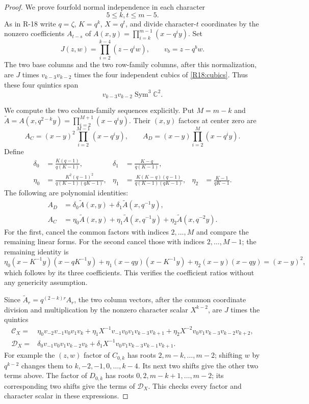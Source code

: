 \begin{proof}
We prove fourfold normal independence in each character
\begin{equation}\label{R19:interior}
 5\leq k,t\leq m-5.
\end{equation}
As in R-18 write $q=\zeta$, $K=q^k$, $X=q^t$, and
divide character-$t$ coordinates by the nonzero
coefficients $A_{t-s}$ of
$A(x,y)=\prod_{i=k}^{m-1}(x-q^iy)$.
Set
\[
 J(z,w)=\prod_{i=2}^{k-4}(z-q^iw),\qquad
 v_b=z-q^bw.
\]
The two base columns and the two row-family columns,
after this normalization, are $J$ times
$v_{k-3}v_{k-2}$ times the four independent cubics
of \eqref{R18:cubics}. Thus these four quintics span
\begin{equation}\label{R19:rowquintics}
 v_{k-3}v_{k-2}\operatorname{Sym}^3\mathbb C^2.
\end{equation}

We compute the two column-family sequences explicitly.
Put $M=m-k$ and
$\widetilde A=A(x,q^{2-k}y)=\prod_{i=2}^{M+1}(x-q^iy)$.
Their $(x,y)$ factors at center zero are
\[
 A_C=(x-y)^2\prod_{i=2}^{M-1}(x-q^iy),\qquad
 A_D=(x-y)\prod_{i=2}^{M}(x-q^iy).
\]
Define
\[
 \begin{aligned}
 \delta_0&=\frac{K(q-1)}{q(K-1)},&
 \delta_1&=\frac{K-q}{q(K-1)},\\
 \eta_0&=\frac{K^2(q-1)^2}{q(K-1)(qK-1)},&
 \eta_1&=\frac{K(K-q)(q-1)}{q(K-1)(qK-1)},&
 \eta_2&=\frac{K-1}{qK-1}.
 \end{aligned}
\]
The following are polynomial identities:
\[
 \begin{aligned}
 A_D&=\delta_0\widetilde A(x,y)
           +\delta_1\widetilde A(x,q^{-1}y),\\
 A_C&=\eta_0\widetilde A(x,y)
           +\eta_1\widetilde A(x,q^{-1}y)
           +\eta_2\widetilde A(x,q^{-2}y).
 \end{aligned}
\]
For the first, cancel the common factors with indices
$2,\ldots,M$ and compare the remaining linear forms.
For the second cancel those with indices $2,\ldots,M-1$;
the remaining identity is
\[
 \eta_0(x-K^{-1}y)(x-qK^{-1}y)
 +\eta_1(x-qy)(x-K^{-1}y)
 +\eta_2(x-y)(x-qy)=(x-y)^2,
\]
which follows by its three coefficients. This verifies
the coefficient ratios without any genericity assumption.

Since $\widetilde A_r=q^{(2-k)r}A_r$,
the two column vectors, after the common coordinate
division and multiplication by the nonzero character
scalar $X^{k-2}$, are $J$ times the quintics
\begin{align*}
 \mathcal C_X={}&
 \eta_0v_{-2}v_{-1}v_0v_1v_k
 +\eta_1X^{-1}v_{-1}v_0v_1v_{k-3}v_{k+1}
 +\eta_2X^{-2}v_0v_1v_{k-3}v_{k-2}v_{k+2},\\
 \mathcal D_X={}&
 \delta_0v_{-1}v_0v_1v_{k-2}v_k
 +\delta_1X^{-1}v_0v_1v_{k-3}v_{k-1}v_{k+1}.
\end{align*}
For example the $(z,w)$ factor of $C_{0,k}$ has roots
$2,m-k,\ldots,m-2$; shifting $w$ by $q^{k-2}$ changes
them to $k,-2,-1,0,\ldots,k-4$.
Its next two shifts give the other two terms above.
The factor of $D_{0,k}$ has roots
$0,2,m-k+1,\ldots,m-2$; its corresponding two shifts
give the terms of $\mathcal D_X$. This checks every
factor and character scalar in these expressions.


\end{proof}
